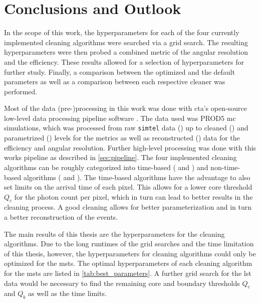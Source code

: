 \chapter{Conclusions and Outlook}%
\label{ch:conclusions}
\vspace{-0.7cm}
In the scope of this work, the hyperparameters for each of the four currently
implemented cleaning algorithms were searched via a grid search. The resulting hyperparameters were then
probed \wrt a combined metric of the angular resolution and the efficiency. These results allowed for a
selection of hyperparameters for further study. Finally, a comparison between the optimized and the default
parameters as well as a comparison between each respective cleaner was performed.
\vspace{-0.025cm}

Most of the data (pre-)processing in this work was done with \gls{cta}'s open-source low-level data processing pipeline
software \ctapipe{}. The data used was PROD5 \gls{mc} simulations, which was processed from raw \texttt{simtel} data
(\rzero) up to cleaned (\dloa) and parametrized (\dlob) levels for the metrics as well as reconstructed (\dlt) data for
the efficiency and angular resolution. Further high-level processing was done with this works pipeline as described in
\autoref{sec:pipeline}. The four implemented cleaning algorithms can be roughly categorized into time-based (\fact{} and \tcc) and non-time-based
algorithms (\tailcuts{} and \mars{}). The time-based algorithms have the advantage to also set limits on the arrival time of each pixel. This allows
for a lower core threshold \(Q_c\) for the photon count per pixel, which in turn can lead to better
results in the cleaning process. A good cleaning allows for better parameterization and in turn
a better reconstruction of the events.
\vspace{-0.025cm}

The main results of this thesis are the hyperparameters for the cleaning algorithms.
Due to the long runtimes of the grid searches and the time limitation of this thesis, however, the hyperparameters
for cleaning algorithms could only be optimized for the \glspl{mst}. The optimal hyperparameters of each cleaning algorithm for
the \glspl{mst} are listed in \autoref{tab:best_parameters}. A further grid search for the \gls{lst}
data would be necessary to find the remaining core and boundary thresholds \(Q_c\) and \(Q_b\) as well
as the time limits.
\vspace{-0.025cm}


